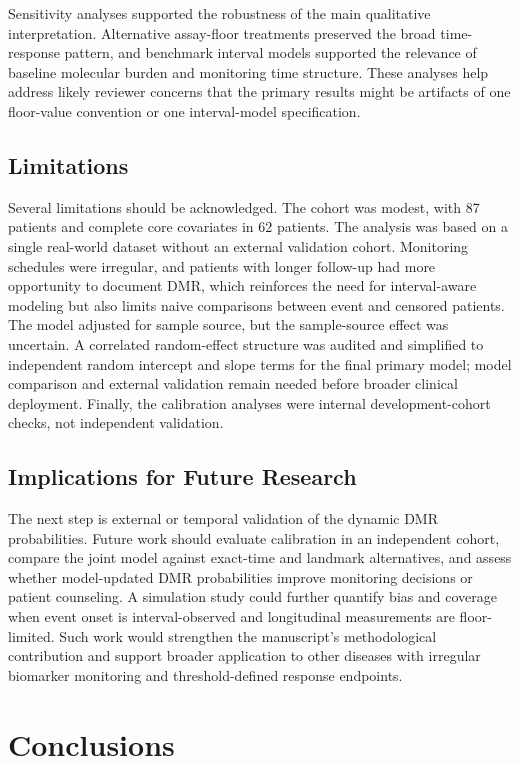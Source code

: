 \documentclass[11pt]{article}
\begin{document}
Sensitivity analyses supported the robustness of the main qualitative interpretation. Alternative assay-floor treatments preserved the broad time-response pattern, and benchmark interval models supported the relevance of baseline molecular burden and monitoring time structure. These analyses help address likely reviewer concerns that the primary results might be artifacts of one floor-value convention or one interval-model specification.

\subsection{Limitations}

Several limitations should be acknowledged. The cohort was modest, with 87 patients and complete core covariates in 62 patients. The analysis was based on a single real-world dataset without an external validation cohort. Monitoring schedules were irregular, and patients with longer follow-up had more opportunity to document DMR, which reinforces the need for interval-aware modeling but also limits naive comparisons between event and censored patients. The model adjusted for sample source, but the sample-source effect was uncertain. A correlated random-effect structure was audited and simplified to independent random intercept and slope terms for the final primary model; model comparison and external validation remain needed before broader clinical deployment. Finally, the calibration analyses were internal development-cohort checks, not independent validation.

\subsection{Implications for Future Research}

The next step is external or temporal validation of the dynamic DMR probabilities. Future work should evaluate calibration in an independent cohort, compare the joint model against exact-time and landmark alternatives, and assess whether model-updated DMR probabilities improve monitoring decisions or patient counseling. A simulation study could further quantify bias and coverage when event onset is interval-observed and longitudinal measurements are floor-limited. Such work would strengthen the manuscript's methodological contribution and support broader application to other diseases with irregular biomarker monitoring and threshold-defined response endpoints.

\section{Conclusions}
\end{document}
